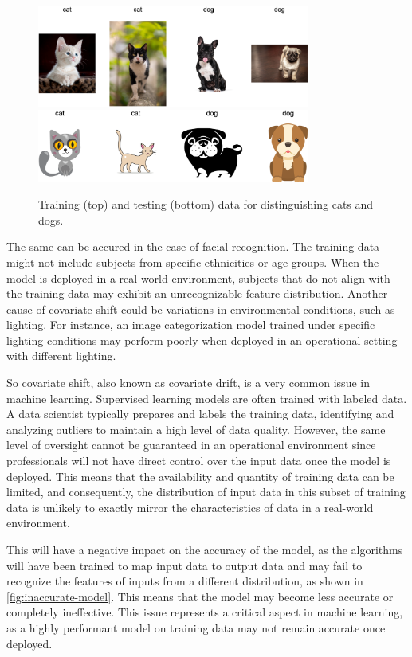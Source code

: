 \begin{figure}[H]
	\centering
	\includegraphics[width=0.8\textwidth]{assets/cat-dog-train.png}
	\includegraphics[width=0.8\textwidth]{assets/cat-dog-test.png} 
	\caption{Training (top) and testing (bottom) data for distinguishing cats and dogs.}
	\label{fig:cani-gatti}
\end{figure}

The same can be accured in the case of facial recognition. The training data might not include subjects from specific ethnicities or age groups. When the model is deployed in a real-world environment, subjects that do not align with the training data may exhibit an unrecognizable feature distribution. Another cause of covariate shift could be variations in environmental conditions, such as lighting. For instance, an image categorization model trained under specific lighting conditions may perform poorly when deployed in an operational setting with different lighting.
	
So covariate shift, also known as covariate drift, is a very common issue in machine learning. Supervised learning models are often trained with labeled data. A data scientist typically prepares and labels the training data, identifying and analyzing outliers to maintain a high level of data quality. However, the same level of oversight cannot be guaranteed in an operational environment since professionals will not have direct control over the input data once the model is deployed. This means that the availability and quantity of training data can be limited, and consequently, the distribution of input data in this subset of training data is unlikely to exactly mirror the characteristics of data in a real-world environment.
	
This will have a negative impact on the accuracy of the model, as the algorithms will have been trained to map input data to output data and may fail to recognize the features of inputs from a different distribution, as shown in \cref{fig:inaccurate-model}. This means that the model may become less accurate or completely ineffective. This issue represents a critical aspect in machine learning, as a highly performant model on training data may not remain accurate once deployed.

